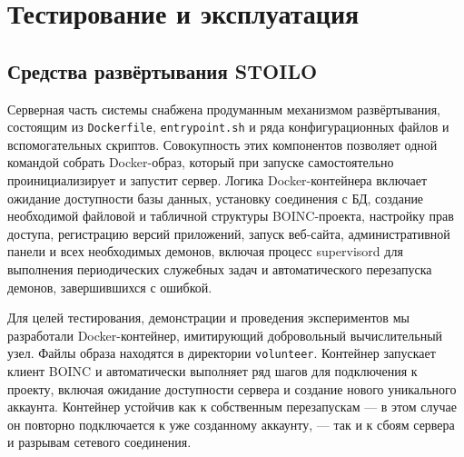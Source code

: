 \documentclass[a4paper,12pt]{extarticle}
\begin{document}


\section{Тестирование и эксплуатация}
\label{sec:deploy}

\subsection{Средства развёртывания STOILO}

Серверная часть системы снабжена продуманным механизмом развёртывания, состоящим из \texttt{Dockerfile}, \texttt{entrypoint.sh} и ряда конфигурационных файлов и вспомогательных скриптов.
Совокупность этих компонентов позволяет одной командой собрать Docker-образ, который при запуске самостоятельно проинициализирует и запустит сервер.
Логика Docker-контейнера включает ожидание доступности базы данных, установку соединения с БД, создание необходимой файловой и табличной структуры BOINC-проекта, настройку прав доступа, регистрацию версий приложений, запуск веб-сайта, административной панели и всех необходимых демонов, включая процесс supervisord для выполнения периодических служебных задач и автоматического перезапуска демонов, завершившихся с ошибкой.

Для целей тестирования, демонстрации и проведения экспериментов мы разработали Docker-контейнер, имитирующий добровольный вычислительный узел.
Файлы образа находятся в директории \texttt{volunteer}.
Контейнер запускает клиент BOINC и автоматически выполняет ряд шагов для подключения к проекту, включая ожидание доступности сервера и создание нового уникального аккаунта.
Контейнер устойчив как к собственным перезапускам — в этом случае он повторно подключается к уже созданному аккаунту, — так и к сбоям сервера и разрывам сетевого соединения.
\end{document}
